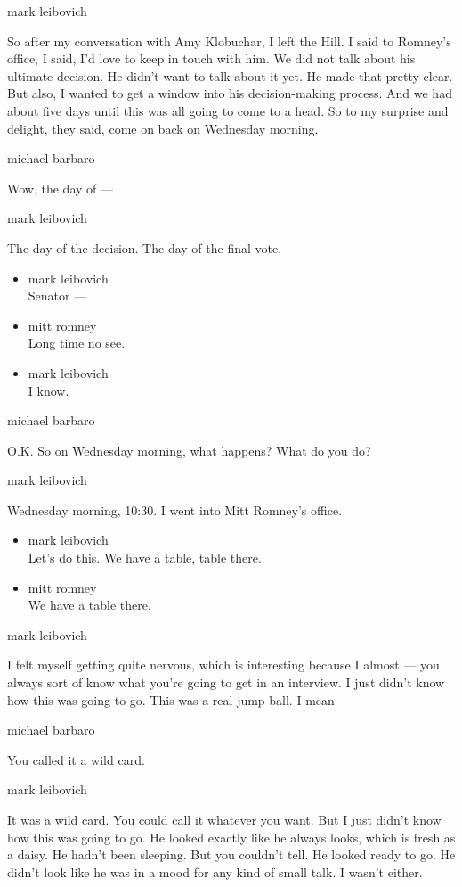 mark leibovich

So after my conversation with Amy Klobuchar, I left the Hill. I said to
Romney's office, I said, I'd love to keep in touch with him. We did not
talk about his ultimate decision. He didn't want to talk about it yet.
He made that pretty clear. But also, I wanted to get a window into his
decision-making process. And we had about five days until this was all
going to come to a head. So to my surprise and delight, they said, come
on back on Wednesday morning.

michael barbaro

Wow, the day of ---

mark leibovich

The day of the decision. The day of the final vote.

\begin{itemize}
\item
  mark leibovich\\
  Senator ---
\item
  mitt romney\\
  Long time no see.
\item
  mark leibovich\\
  I know.
\end{itemize}

michael barbaro

O.K. So on Wednesday morning, what happens? What do you do?

mark leibovich

Wednesday morning, 10:30. I went into Mitt Romney's office.

\begin{itemize}
\item
  mark leibovich\\
  Let's do this. We have a table, table there.
\item
  mitt romney\\
  We have a table there.
\end{itemize}

mark leibovich

I felt myself getting quite nervous, which is interesting because I
almost --- you always sort of know what you're going to get in an
interview. I just didn't know how this was going to go. This was a real
jump ball. I mean ---

michael barbaro

You called it a wild card.

mark leibovich

It was a wild card. You could call it whatever you want. But I just
didn't know how this was going to go. He looked exactly like he always
looks, which is fresh as a daisy. He hadn't been sleeping. But you
couldn't tell. He looked ready to go. He didn't look like he was in a
mood for any kind of small talk. I wasn't either.

